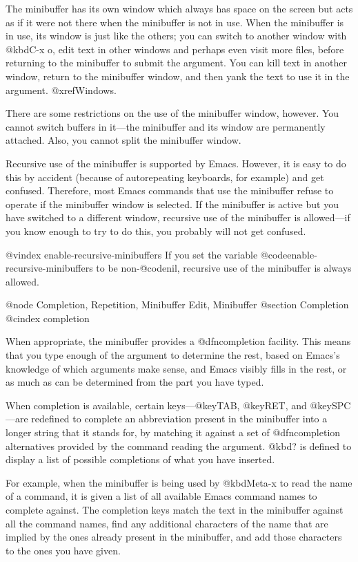 {{{{{  The minibuffer has its own window which always has space on the screen
but acts as if it were not there when the minibuffer is not in use.  When
the minibuffer is in use, its window is just like the others; you can
switch to another window with @kbd{C-x o}, edit text in other windows and
perhaps even visit more files, before returning to the minibuffer to submit
the argument.  You can kill text in another window, return to the
minibuffer window, and then yank the text to use it in the argument.
@xref{Windows}.

  There are some restrictions on the use of the minibuffer window, however.
You cannot switch buffers in it---the minibuffer and its window are
permanently attached.  Also, you cannot split the minibuffer window.

  Recursive use of the minibuffer is supported by Emacs.  However, it is
easy to do this by accident (because of autorepeating keyboards, for
example) and get confused.  Therefore, most Emacs commands that use the
minibuffer refuse to operate if the minibuffer window is selected.  If the
minibuffer is active but you have switched to a different window, recursive
use of the minibuffer is allowed---if you know enough to try to do this,
you probably will not get confused.

@vindex enable-recursive-minibuffers
  If you set the variable @code{enable-recursive-minibuffers} to be
non-@code{nil}, recursive use of the minibuffer is always allowed.

@node Completion, Repetition, Minibuffer Edit, Minibuffer
@section Completion
@cindex completion

  When appropriate, the minibuffer provides a @dfn{completion} facility.
This means that you type enough of the argument to determine the rest,
based on Emacs's knowledge of which arguments make sense, and Emacs visibly
fills in the rest, or as much as can be determined from the part you have
typed.

  When completion is available, certain keys---@key{TAB}, @key{RET}, and @key{SPC}---are
redefined to complete an abbreviation present in the minibuffer into a
longer string that it stands for, by matching it against a set of
@dfn{completion alternatives} provided by the command reading the argument.
@kbd{?} is defined to display a list of possible completions of what you
have inserted.

  For example, when the minibuffer is being used by @kbd{Meta-x} to read
the name of a command, it is given a list of all available Emacs command
names to complete against.  The completion keys match the text in the
minibuffer against all the command names, find any additional characters of
the name that are implied by the ones already present in the minibuffer,
and add those characters to the ones you have given.

}}}}}
